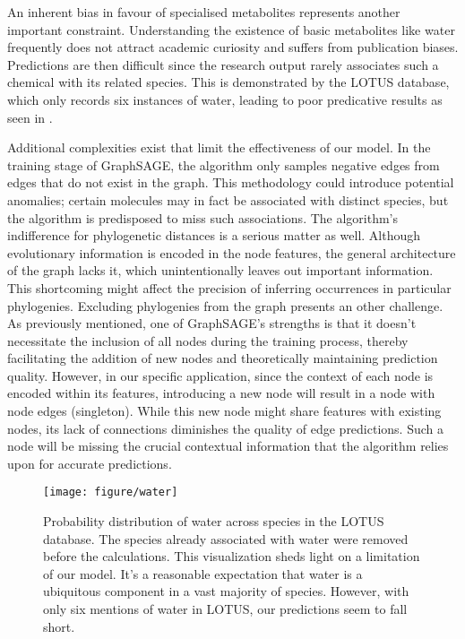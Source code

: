 \documentclass[
11pt, %
oneside, %
english, %
singlespacing, %
headsepline, %
chapterinoneline, %
]{MastersDoctoralThesis} %
\begin{document}
An inherent bias in favour of specialised metabolites represents another important constraint. Understanding the existence of basic metabolites like water frequently does not attract academic curiosity and suffers from publication biases. Predictions are then difficult since the research output rarely associates such a chemical with its related species. This is demonstrated by the LOTUS database, which only records six instances of water, leading to poor predicative results as seen in .

Additional complexities exist that limit the effectiveness of our model. In the training stage of GraphSAGE, the algorithm only samples negative edges from edges that do not exist in the graph. This methodology could introduce potential anomalies; certain molecules may in fact be associated with distinct species, but the algorithm is predisposed to miss such associations. The algorithm's indifference for phylogenetic distances is a serious matter as well. Although evolutionary information is encoded in the node features, the general architecture of the graph lacks it, which unintentionally leaves out important information. This shortcoming might affect the precision of inferring occurrences in particular phylogenies. Excluding phylogenies from the graph presents an other challenge. As previously mentioned, one of GraphSAGE's strengths is that it doesn't necessitate the inclusion of all nodes during the training process, thereby facilitating the addition of new nodes and theoretically maintaining prediction quality. However, in our specific application, since the context of each node is encoded within its features, introducing a new node will result in a node with node edges (singleton). While this new node might share features with existing nodes, its lack of connections diminishes the quality of edge predictions. Such a node will be missing the crucial contextual information that the algorithm relies upon for accurate predictions.

\begin{figure}[h]
	\centering
	\texttt{[image: figure/water]}
	\caption{Probability distribution of water across species in the LOTUS database. The species already associated with water were removed before the calculations. This visualization sheds light on a limitation of our model. It's a reasonable expectation that water is a ubiquitous component in a vast majority of species. However, with only six mentions of water in LOTUS, our predictions seem to fall short.}
	\label{fig: water probabilities}
\end{figure}
\end{document}
